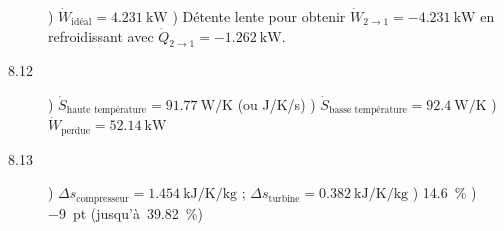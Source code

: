 \begin{description}
							) $\dot{W}_\text{idéal} = \SI{+4,231}{\kilo\watt}$
							) Détente lente pour obtenir $\dot{W}_{2\to 1} = \SI{-4,231}{\kilo\watt}$ en refroidissant avec $\dot{Q}_{2\to 1} = \SI{-1,262}{\kilo\watt}$.
		\item [8.12] 	) $\dot{S}_\text{haute température} = \SI{+91,77}{\watt\per\kelvin}$ (ou \si[per-mode = symbol]{\joule\per\kelvin\per\second})
							) $\dot{S}_\text{basse\ température} = \SI{+92,4}{\watt\per\kelvin}$
							) $\dot{W}_\text{perdue} = \SI{+52,14}{\kilo\watt}$
		\item [8.13] 	) $\Delta s_\text{compresseur} = \SI{+1,454}{\kilo\joule\per\kelvin\per\kilogram}$ ; $\Delta s_\text{turbine} = \SI{+0,382}{\kilo\joule\per\kelvin\per\kilogram}$
							) \SI{+14,6}{\percent}
							) \SI{-9}{pt} (jusqu’à~\SI{39,82}{\percent})
	\end{description}
